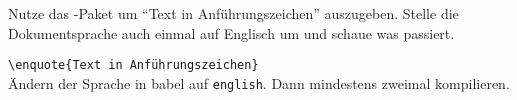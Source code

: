 \item Nutze das -Paket um \enquote{Text in Anführungszeichen} auszugeben.
    Stelle die Dokumentsprache auch einmal auf Englisch um und
    schaue was passiert.\label{csquotes}
\begin{loesung}
    \verb|\enquote{Text in Anführungszeichen}|\\
    Ändern der Sprache in babel auf \texttt{english}. Dann mindestens zweimal kompilieren.
\end{loesung}